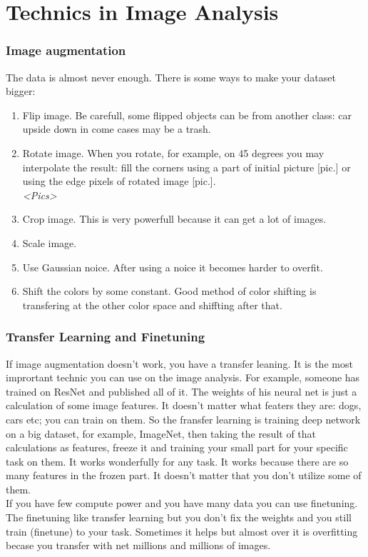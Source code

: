 \section{Technics in Image Analysis}
\vspace{-0.6cm}
\subsubsection*{Image augmentation}

The data is almost never enough. There is some ways to make your dataset bigger:
\begin{enumerate}[label=$\bullet$]
  \item Flip image. Be carefull, some flipped objects can be from another class: car upside down in come cases may be a trash.
  \item Rotate image. When you rotate, for example, on 45 degrees you may interpolate the result: fill the corners using a part of initial picture [pic.] or using the edge pixels of rotated image [pic.].\\
  {\it <Pics>}
  \item Crop image. This is very powerfull because it can get a lot of images.
  \item Scale image.
  \item Use Gaussian noice. After using a noice it becomes harder to overfit.
  \item Shift the colors by some constant. Good method of color shifting is transfering at the other color space and shiffting after that.
\end{enumerate}

\subsubsection*{Transfer Learning and Finetuning}

If image augmentation doesn't work, you have a transfer leaning. It is the most imprortant technic you can use on the image analysis. For example, someone has trained on ResNet and published all of it. The weights of his neural net is just a calculation of some image features. It doesn't matter what featers they are: dogs, cars etc; you can train on them. So the fransfer learning is training deep network on a big dataset, for example, ImageNet, then taking the result of that calculations as features, freeze it and training your small part for your specific task on them. It works wonderfully for any task. It works because there are so many features in the frozen part. It doesn't matter that you don't utilize some of them.\\
If you have few compute power and you have many data you can use finetuning. The finetuning like transfer learning but you don't fix the weights and you still train (finetune) to your task. Sometimes it helps but almost over it is overfitting becase you transfer with net millions and millions of images.